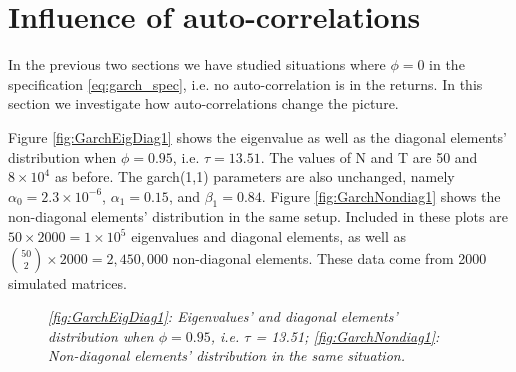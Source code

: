 \documentclass{report}
\begin{document}
\section{Influence of auto-correlations}
\label{sec:garch_nonzero_phi}
In the previous two sections we have studied situations where
$\phi=0$ in the specification \ref{eq:garch_spec}, i.e. no
auto-correlation is in the returns. In this section we investigate how
auto-correlations change the picture.


Figure \ref{fig:GarchEigDiag1} shows the eigenvalue as well as the
diagonal elements' distribution when $\phi = 0.95$, i.e. $\tau =
13.51$. The values of N and T are 50 and $8\times 10^4$ as before. The
\gls{garch}(1,1) parameters are also unchanged, namely $\alpha_0 = 2.3\times
10^{-6}$, $\alpha_1 = 0.15$, and $\beta_1 = 0.84$. Figure
\ref{fig:GarchNondiag1} shows the non-diagonal elements' distribution
in the same setup. Included in these plots are $50 \times 2000 =
1\times 10^5$ eigenvalues and diagonal elements, as well as ${50
  \choose 2} \times 2000 = 2,450,000$ non-diagonal elements. These
data come from 2000 simulated matrices.
\begin{figure}[htb!]
  \centering
  \caption{\small \it \ref{fig:GarchEigDiag1}: Eigenvalues' and
    diagonal elements' distribution when $\phi = 0.95$, i.e. $\tau$ =
    13.51; \ref{fig:GarchNondiag1}: Non-diagonal elements'
    distribution in the same situation.}
\end{figure}
\end{document}
